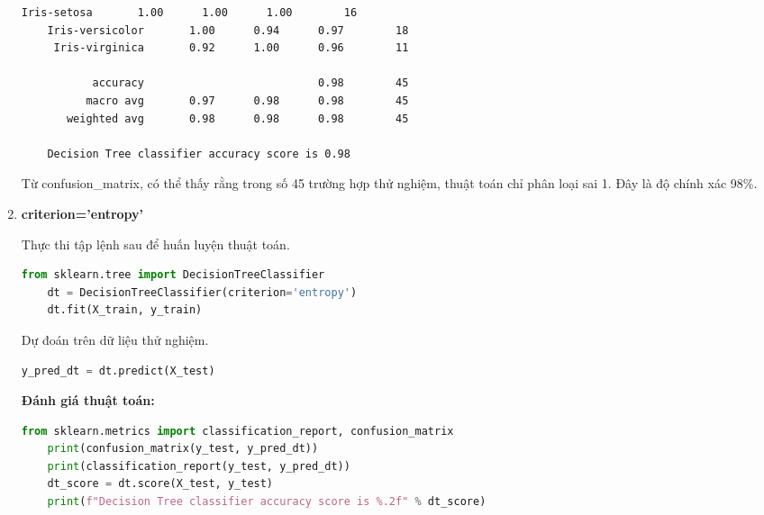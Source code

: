 \begin{enumerate}[label=(\alph*)]
\begin{center}
\begin{lstlisting}[basicstyle=\fontsize{11}{13}\selectfont\ttfamily]
        Iris-setosa       1.00      1.00      1.00        16
    Iris-versicolor       1.00      0.94      0.97        18
     Iris-virginica       0.92      1.00      0.96        11
    
           accuracy                           0.98        45
          macro avg       0.97      0.98      0.98        45
       weighted avg       0.98      0.98      0.98        45
    
    Decision Tree classifier accuracy score is 0.98
    \end{lstlisting}
    \end{center}

    Từ confusion\_matrix, có thể thấy rằng trong số 45 trường hợp thử nghiệm, thuật toán chỉ phân loại sai 1. Đây là độ chính xác 98\%.
    
    \item \textbf{criterion='entropy'}
    
    Thực thi tập lệnh sau để huấn luyện thuật toán.
    
    \begin{center}
    \begin{lstlisting}[language=Python,breaklines=true]
    from sklearn.tree import DecisionTreeClassifier  
    dt = DecisionTreeClassifier(criterion='entropy')  
    dt.fit(X_train, y_train)
    \end{lstlisting}
    \end{center}

    Dự đoán trên dữ liệu thử nghiệm.
    
    \begin{center}
    \begin{lstlisting}[language=Python,breaklines=true]
    y_pred_dt = dt.predict(X_test)
    \end{lstlisting}
    \end{center}

    \textbf{Đánh giá thuật toán:}
    
    \begin{center}
    \begin{lstlisting}[language=Python,breaklines=true]
    from sklearn.metrics import classification_report, confusion_matrix
    print(confusion_matrix(y_test, y_pred_dt))
    print(classification_report(y_test, y_pred_dt))
    dt_score = dt.score(X_test, y_test)
    print(f"Decision Tree classifier accuracy score is %.2f" % dt_score)
    \end{lstlisting}
    \end{center}


\end{enumerate}
